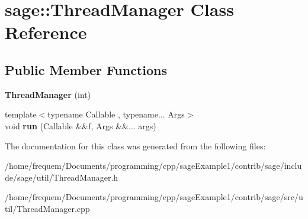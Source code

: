\hypertarget{classsage_1_1ThreadManager}{}\section{sage\+::Thread\+Manager Class Reference}
\label{classsage_1_1ThreadManager}
\subsection*{Public Member Functions}
\begin{DoxyCompactItemize}
\item 
\mbox{\label{classsage_1_1ThreadManager_af7d592b11ce70f64729bc6be1a35f1de}} 
{\bfseries Thread\+Manager} (int)
\item 
\mbox{\label{classsage_1_1ThreadManager_abb7e6b4a8ed44173eff9de2213f64236}} 
{\footnotesize template$<$typename Callable , typename... Args$>$ }\\void {\bfseries run} (Callable \&\&f, Args \&\&... args)
\end{DoxyCompactItemize}


The documentation for this class was generated from the following files\+:\begin{DoxyCompactItemize}
\item 
/home/frequem/\+Documents/programming/cpp/sage\+Example1/contrib/sage/include/sage/util/Thread\+Manager.\+h\item 
/home/frequem/\+Documents/programming/cpp/sage\+Example1/contrib/sage/src/util/Thread\+Manager.\+cpp\end{DoxyCompactItemize}

